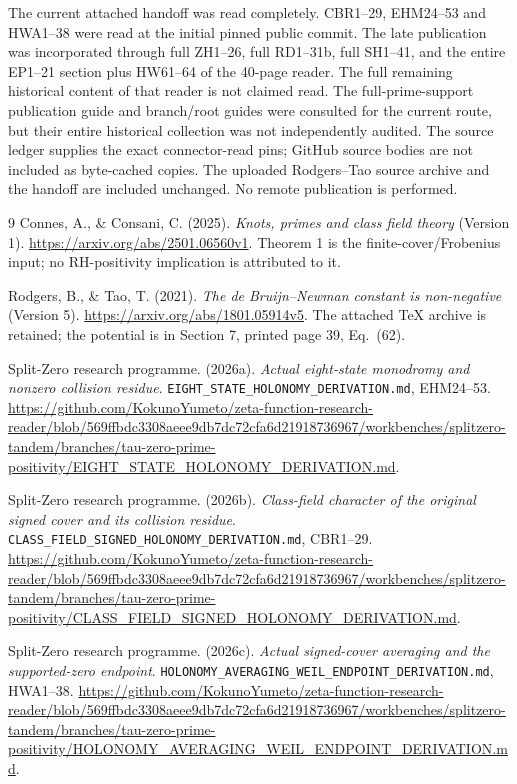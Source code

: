 \documentclass[11pt,a4paper]{article}
\theoremstyle{definition}
\begin{document}
The current attached handoff was read completely. CBR1--29, EHM24--53 and HWA1--38 were read at the initial pinned public commit. The late publication was incorporated through full ZH1--26, full RD1--31b, full SH1--41, and the entire EP1--21 section plus HW61--64 of the 40-page reader. The full remaining historical content of that reader is not claimed read. The full-prime-support publication guide and branch/root guides were consulted for the current route, but their entire historical collection was not independently audited. The source ledger supplies the exact connector-read pins; GitHub source bodies are not included as byte-cached copies. The uploaded Rodgers--Tao source archive and the handoff are included unchanged. No remote publication is performed.

\begin{thebibliography}{9}
Connes, A., \& Consani, C. (2025).
\emph{Knots, primes and class field theory} (Version 1).
\url{https://arxiv.org/abs/2501.06560v1}.
Theorem 1 is the finite-cover/Frobenius input; no RH-positivity implication is attributed to it.

Rodgers, B., \& Tao, T. (2021).
\emph{The de Bruijn--Newman constant is non-negative} (Version 5).
\url{https://arxiv.org/abs/1801.05914v5}.
The attached TeX archive is retained; the potential is in Section 7, printed page 39, Eq.~(62).

Split-Zero research programme. (2026a).
\emph{Actual eight-state monodromy and nonzero collision residue}.
\texttt{EIGHT\_STATE\_HOLONOMY\_DERIVATION.md}, EHM24--53.
\url{https://github.com/KokunoYumeto/zeta-function-research-reader/blob/569ffbdc3308aeee9db7dc72cfa6d21918736967/workbenches/splitzero-tandem/branches/tau-zero-prime-positivity/EIGHT_STATE_HOLONOMY_DERIVATION.md}.

Split-Zero research programme. (2026b).
\emph{Class-field character of the original signed cover and its collision residue}.
\texttt{CLASS\_FIELD\_SIGNED\_HOLONOMY\_DERIVATION.md}, CBR1--29.
\url{https://github.com/KokunoYumeto/zeta-function-research-reader/blob/569ffbdc3308aeee9db7dc72cfa6d21918736967/workbenches/splitzero-tandem/branches/tau-zero-prime-positivity/CLASS_FIELD_SIGNED_HOLONOMY_DERIVATION.md}.

Split-Zero research programme. (2026c).
\emph{Actual signed-cover averaging and the supported-zero endpoint}.
\texttt{HOLONOMY\_AVERAGING\_WEIL\_ENDPOINT\_DERIVATION.md}, HWA1--38.
\url{https://github.com/KokunoYumeto/zeta-function-research-reader/blob/569ffbdc3308aeee9db7dc72cfa6d21918736967/workbenches/splitzero-tandem/branches/tau-zero-prime-positivity/HOLONOMY_AVERAGING_WEIL_ENDPOINT_DERIVATION.md}.


\end{thebibliography}
\end{document}
